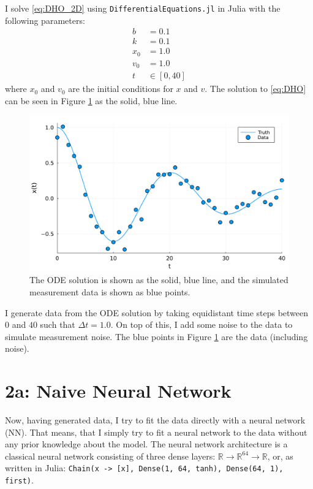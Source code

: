 \documentclass[10pt,a4paper]{article}
\begin{document}
I solve \eqref{eq:DHO_2D} using \texttt{DifferentialEquations.jl} in Julia with the following parameters:
\begin{equation}
    \begin{split}
        b &= 0.1 \\
        k &= 0.1 \\
        x_0 &= 1.0 \\
        v_0 &= 1.0 \\
        t &\in [0, 40]
    \end{split}
\end{equation}
where $x_0$ and $v_0$ are the initial conditions for $x$ and $v$.
The solution to \eqref{eq:DHO} can be seen in Figure \ref{fig:DHO} as the solid, blue line.

\begin{figure}[H]
    \includegraphics[width=\linewidth]{truth.pdf}
    \caption{The ODE solution is shown as the solid, blue line, and the simulated measurement data is shown as blue points.}
    \label{fig:DHO}
\end{figure}

I generate data from the ODE solution by taking equidistant time steps between $0$ and $40$ such that $\Delta t = 1.0$.
On top of this, I add some noise to the data to simulate measurement noise.
The blue points in Figure \ref{fig:DHO} are the data (including noise).

\section*{2a: Naive Neural Network}

Now, having generated data, I try to fit the data directly with a neural network (NN).
That means, that I simply try to fit a neural network to the data without any prior knowledge about the model.
The neural network architecture is a classical neural network consisting of three dense layers:
${\mathbb{R} \rightarrow \mathbb{R}^{64} \rightarrow \mathbb{R}}$, or, as written in Julia:
\mbox{\texttt{Chain(x -> [x], Dense(1, 64, tanh), Dense(64, 1), first)}}.
\end{document}
